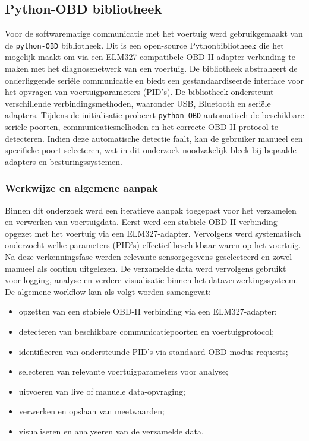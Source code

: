 \subsection{Python-OBD bibliotheek}
Voor de softwarematige communicatie met het voertuig werd gebruikgemaakt van de \texttt{python-OBD} bibliotheek. Dit is een open-source Pythonbibliotheek die het mogelijk maakt om via een ELM327-compatibele OBD-II adapter verbinding te maken met het diagnosenetwerk van een voertuig. De bibliotheek abstraheert de onderliggende seriële communicatie en biedt een gestandaardiseerde interface voor het opvragen van voertuigparameters (PID's).
De bibliotheek ondersteunt verschillende verbindingsmethoden, waaronder USB, Bluetooth en seriële adapters. Tijdens de initialisatie probeert \texttt{python-OBD} automatisch de beschikbare seriële poorten, communicatiesnelheden en het correcte OBD-II protocol te detecteren. Indien deze automatische detectie faalt, kan de gebruiker manueel een specifieke poort selecteren, wat in dit onderzoek noodzakelijk bleek bij bepaalde adapters en besturingssystemen.

\subsubsection{Werkwijze en algemene aanpak}
Binnen dit onderzoek werd een iteratieve aanpak toegepast voor het verzamelen en verwerken van voertuigdata. Eerst werd een stabiele OBD-II verbinding opgezet met het voertuig via een ELM327-adapter. Vervolgens werd systematisch onderzocht welke parameters (PID's) effectief beschikbaar waren op het voertuig.
Na deze verkenningsfase werden relevante sensorgegevens geselecteerd en zowel manueel als continu uitgelezen. De verzamelde data werd vervolgens gebruikt voor logging, analyse en verdere visualisatie binnen het dataverwerkingssysteem.
De algemene workflow kan als volgt worden samengevat:
\begin{itemize}
    \item opzetten van een stabiele OBD-II verbinding via een ELM327-adapter;
    \item detecteren van beschikbare communicatiepoorten en voertuigprotocol;
    \item identificeren van ondersteunde PID's via standaard OBD-modus requests;
    \item selecteren van relevante voertuigparameters voor analyse;
    \item uitvoeren van live of manuele data-opvraging;
    \item verwerken en opslaan van meetwaarden;
    \item visualiseren en analyseren van de verzamelde data.
\end{itemize}

